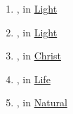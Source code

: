\begin{enumerate}
		\item \hyperref[PHOS]{}, in \hyperref[LIGHT]{Light}
		
		\item \hyperref[PHOTIZO]{}, in \hyperref[LIGHT]{Light}
		
		\item \hyperref[CHRISTOS]{}, in \hyperref[CHRIST]{Christ}
		
		\item \hyperref[PSUCHE]{}, in \hyperref[LIFE]{Life}
		
		\item \hyperref[PSUCHIKOS]{}, in \hyperref[NATURAL]{Natural}
	
	\end{enumerate}
